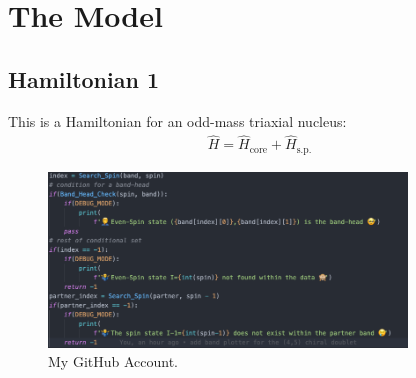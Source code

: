 \chapter{The Model}

\section{Hamiltonian 1}

This is a Hamiltonian for an odd-mass triaxial nucleus:
\begin{align}
    \hat{H}=\hat{H}_\text{core}+\hat{H}_\text{s.p.}
\end{align}

\lipsum[1-8]

\begin{figure}
    \centering
    \includegraphics[width=0.85\textwidth]{figs/cuterr_code.png}
    \caption{My GitHub Account.}
    \label{github_account}
\end{figure}